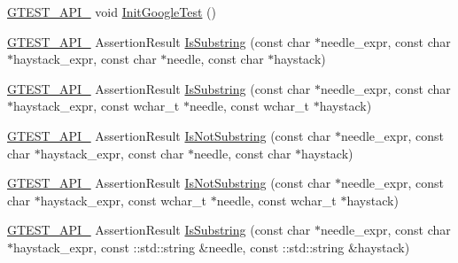 \begin{DoxyCompactItemize}
\item 
\mbox{\hyperlink{_obj__test_2lib_2googletest-release-1_88_81_2googletest_2include_2gtest_2internal_2gtest-port_8h_aa73be6f0ba4a7456180a94904ce17790}{G\+T\+E\+S\+T\+\_\+\+A\+P\+I\+\_\+}} void \mbox{\hyperlink{namespacetesting_ace27eb9a2534996f3711aa719689f987}{Init\+Google\+Test}} ()
\item 
\mbox{\hyperlink{_obj__test_2lib_2googletest-release-1_88_81_2googletest_2include_2gtest_2internal_2gtest-port_8h_aa73be6f0ba4a7456180a94904ce17790}{G\+T\+E\+S\+T\+\_\+\+A\+P\+I\+\_\+}} Assertion\+Result \mbox{\hyperlink{namespacetesting_a390c4f66fe7e9098117eb77e5fffa4ad}{Is\+Substring}} (const char $\ast$needle\+\_\+expr, const char $\ast$haystack\+\_\+expr, const char $\ast$needle, const char $\ast$haystack)
\item 
\mbox{\hyperlink{_obj__test_2lib_2googletest-release-1_88_81_2googletest_2include_2gtest_2internal_2gtest-port_8h_aa73be6f0ba4a7456180a94904ce17790}{G\+T\+E\+S\+T\+\_\+\+A\+P\+I\+\_\+}} Assertion\+Result \mbox{\hyperlink{namespacetesting_aa1c82529c7591d2a9fd016de45dd9113}{Is\+Substring}} (const char $\ast$needle\+\_\+expr, const char $\ast$haystack\+\_\+expr, const wchar\+\_\+t $\ast$needle, const wchar\+\_\+t $\ast$haystack)
\item 
\mbox{\hyperlink{_obj__test_2lib_2googletest-release-1_88_81_2googletest_2include_2gtest_2internal_2gtest-port_8h_aa73be6f0ba4a7456180a94904ce17790}{G\+T\+E\+S\+T\+\_\+\+A\+P\+I\+\_\+}} Assertion\+Result \mbox{\hyperlink{namespacetesting_a2288dcf4249f88af67dcd46544dc49a6}{Is\+Not\+Substring}} (const char $\ast$needle\+\_\+expr, const char $\ast$haystack\+\_\+expr, const char $\ast$needle, const char $\ast$haystack)
\item 
\mbox{\hyperlink{_obj__test_2lib_2googletest-release-1_88_81_2googletest_2include_2gtest_2internal_2gtest-port_8h_aa73be6f0ba4a7456180a94904ce17790}{G\+T\+E\+S\+T\+\_\+\+A\+P\+I\+\_\+}} Assertion\+Result \mbox{\hyperlink{namespacetesting_a53e5c6e91ea429c43de7f4f57e33d166}{Is\+Not\+Substring}} (const char $\ast$needle\+\_\+expr, const char $\ast$haystack\+\_\+expr, const wchar\+\_\+t $\ast$needle, const wchar\+\_\+t $\ast$haystack)
\item 
\mbox{\hyperlink{_obj__test_2lib_2googletest-release-1_88_81_2googletest_2include_2gtest_2internal_2gtest-port_8h_aa73be6f0ba4a7456180a94904ce17790}{G\+T\+E\+S\+T\+\_\+\+A\+P\+I\+\_\+}} Assertion\+Result \mbox{\hyperlink{namespacetesting_a571c7edcfc574269833ebe3e7d338ec5}{Is\+Substring}} (const char $\ast$needle\+\_\+expr, const char $\ast$haystack\+\_\+expr, const \+::std\+::string \&needle, const \+::std\+::string \&haystack)

\end{DoxyCompactItemize}
